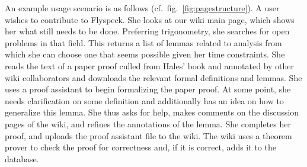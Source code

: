 \begin{scenario}
An example usage scenario is as follows (cf.\ fig.~\ref{fig:pagestructure}). A
user wishes to contribute to Flyspeck.  She looks at our wiki main page, which
shows her what still needs to be done.  Preferring trigonometry, she searches
for open problems in that field.  This returns a list of lemmas related to
analysis from which she can choose one that seems possible given her time
constraints. She reads the text of a paper proof culled from Hales' book and
annotated by other wiki collaborators and downloads the relevant formal
definitions and lemmas.  She uses a proof assistant to begin formalizing the
paper proof.  At some point, she needs clarification on some definition and
additionally has an idea on how to generalize this lemma.  She thus asks for
help, makes comments on the discussion pages of the wiki, and refines the
annotations of the lemma.  She completes her proof, and uploads the proof
assistant file to the wiki.  The wiki uses a theorem prover to check the proof
for correctness and, if it is correct, adds it to the database.


\end{scenario}
